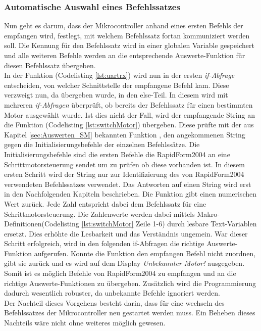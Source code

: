 \subsubsection{Automatische Auswahl eines Befehlssatzes}
\label{AutoProtokoll}
Nun geht es darum, dass der Mikrocontroller anhand eines ersten Befehls der empfangen wird, festlegt, mit welchem Befehlssatz fortan kommuniziert werden soll. Die Kennung für den Befehlssatz wird in einer globalen Variable gespeichert und alle weiteren Befehle werden an die entsprechende Auswerte-Funktion für diesen Befehlssatz übergeben.\\
In der Funktion (Codelisting \ref{lst:uartrx}) wird nun in der ersten \emph{if-Abfrage} entscheiden, von welcher Schnittstelle der empfangene Befehl kam. Diese verzweigt nun, da  übergeben wurde, in den else-Teil. In diesem wird mit mehreren \emph{if-Abfragen} überprüft, ob bereits der Befehlssatz für einen bestimmten Motor ausgewählt wurde. Ist dies nicht der Fall, wird der empfangende String an die Funktion (Codelisting \ref{lst:switchMotor}) übergeben. Diese prüfte mit der aus Kapitel \ref{sec:Auswerten_SM} bekannten Funktion , den angekommenen String gegen die Initialisierungsbefehle der einzelnen Befehlssätze. Die Initialisierungsbefehle sind die ersten Befehle die RapidForm2004 an eine Schrittmotorsteuerung sendet um zu prüfen ob diese vorhanden ist. In diesem ersten Schritt wird der String nur zur Identifizierung des von RapidForm2004 verwendeten Befehlssatzes verwendet. Das Antworten auf einen String wird erst in den Nachfolgenden Kapiteln beschrieben. Die Funktion  gibt einen numerischen Wert zurück. Jede Zahl entspricht dabei dem Befehlssatz für eine Schrittmotorsteuerung. Die Zahlenwerte werden dabei mittels Makro-Definitionen(Codelisting \ref{lst:switchMotor} Zeile 1-6) durch lesbare Text-Variablen ersetzt. Dies erhöhte die Lesbarkeit und das Verständnis ungemein. War dieser Schritt erfolgreich, wird in den folgenden if-Abfragen die richtige Auswerte-Funktion aufgerufen. Konnte die Funktion  den empfangen Befehl nicht zuordnen, gibt sie  zurück und es wird auf dem Display \emph{Unbekannter Motor!} ausgegeben.\\
Somit ist es möglich Befehle von RapidForm2004 zu empfangen und an die richtige Auswerte-Funktionen zu übergeben. Zusätzlich wird die Programmierung dadurch wesentlich robuster, da unbekannte Befehle ignoriert werden.\\
Der Nachteil dieses Vorgehens besteht darin, dass für eine wechseln des Befehlssatzes der Mikrocontroller neu gestartet werden muss. Ein Beheben dieses Nachteils wäre nicht ohne weiteres möglich gewesen.

